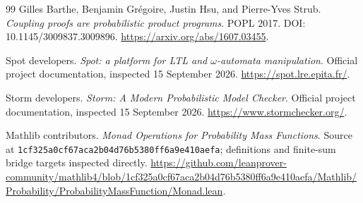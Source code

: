 \begin{thebibliography}{99}
Gilles Barthe, Benjamin Gr\'egoire, Justin Hsu, and Pierre-Yves Strub.
\emph{Coupling proofs are probabilistic product programs}. POPL 2017.
DOI: 10.1145/3009837.3009896.
\url{https://arxiv.org/abs/1607.03455}.

Spot developers. \emph{Spot: a platform for LTL and $\omega$-automata manipulation}.
Official project documentation, inspected 15 September 2026.
\url{https://spot.lre.epita.fr/}.

Storm developers. \emph{Storm: A Modern Probabilistic Model Checker}.
Official project documentation, inspected 15 September 2026.
\url{https://www.stormchecker.org/}.

Mathlib contributors. \emph{Monad Operations for Probability Mass Functions}.
Source at \texttt{1cf325a0cf67aca2b04d76b5380ff6a9e410aefa}; definitions and
finite-sum bridge targets inspected directly.
\url{https://github.com/leanprover-community/mathlib4/blob/1cf325a0cf67aca2b04d76b5380ff6a9e410aefa/Mathlib/Probability/ProbabilityMassFunction/Monad.lean}.
\end{thebibliography}
